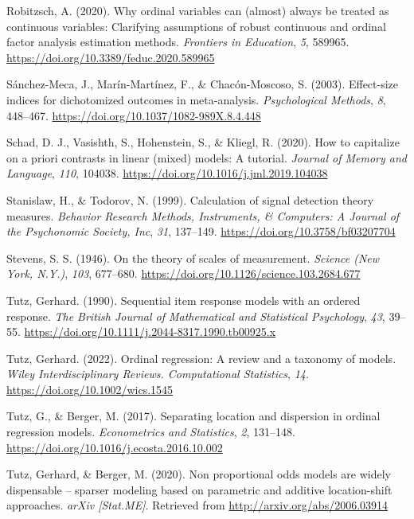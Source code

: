 \documentclass[
  man,floatsintext]{apa6}
\newlength{\cslhangindent}
\newenvironment{CSLReferences}[2] %
 {\begin{list}{}{%
  \setlength{\itemindent}{0pt}
  \setlength{\leftmargin}{0pt}
  \setlength{\parsep}{0pt}
  \ifodd #1
   \setlength{\leftmargin}{\cslhangindent}
   \setlength{\itemindent}{-1\cslhangindent}
  \fi
  \setlength{\itemsep}{#2\baselineskip}}}
 {\end{list}}
\begin{document}
\begin{CSLReferences}{1}{0}
Robitzsch, A. (2020). Why ordinal variables can (almost) always be treated as continuous variables: Clarifying assumptions of robust continuous and ordinal factor analysis estimation methods. \emph{Frontiers in Education}, \emph{5}, 589965. \url{https://doi.org/10.3389/feduc.2020.589965}

Sánchez-Meca, J., Marín-Martínez, F., \& Chacón-Moscoso, S. (2003). Effect-size indices for dichotomized outcomes in meta-analysis. \emph{Psychological Methods}, \emph{8}, 448--467. \url{https://doi.org/10.1037/1082-989X.8.4.448}

Schad, D. J., Vasishth, S., Hohenstein, S., \& Kliegl, R. (2020). How to capitalize on a priori contrasts in linear (mixed) models: A tutorial. \emph{Journal of Memory and Language}, \emph{110}, 104038. \url{https://doi.org/10.1016/j.jml.2019.104038}

Stanislaw, H., \& Todorov, N. (1999). Calculation of signal detection theory measures. \emph{Behavior Research Methods, Instruments, \& Computers: A Journal of the Psychonomic Society, Inc}, \emph{31}, 137--149. \url{https://doi.org/10.3758/bf03207704}

Stevens, S. S. (1946). On the theory of scales of measurement. \emph{Science (New York, N.Y.)}, \emph{103}, 677--680. \url{https://doi.org/10.1126/science.103.2684.677}

Tutz, Gerhard. (1990). Sequential item response models with an ordered response. \emph{The British Journal of Mathematical and Statistical Psychology}, \emph{43}, 39--55. \url{https://doi.org/10.1111/j.2044-8317.1990.tb00925.x}

Tutz, Gerhard. (2022). Ordinal regression: A review and a taxonomy of models. \emph{Wiley Interdisciplinary Reviews. Computational Statistics}, \emph{14}. \url{https://doi.org/10.1002/wics.1545}

Tutz, G., \& Berger, M. (2017). Separating location and dispersion in ordinal regression models. \emph{Econometrics and Statistics}, \emph{2}, 131--148. \url{https://doi.org/10.1016/j.ecosta.2016.10.002}

Tutz, Gerhard, \& Berger, M. (2020). Non proportional odds models are widely dispensable -- sparser modeling based on parametric and additive location-shift approaches. \emph{arXiv {[}Stat.ME{]}}. Retrieved from \url{http://arxiv.org/abs/2006.03914}

\end{CSLReferences}
\end{document}

